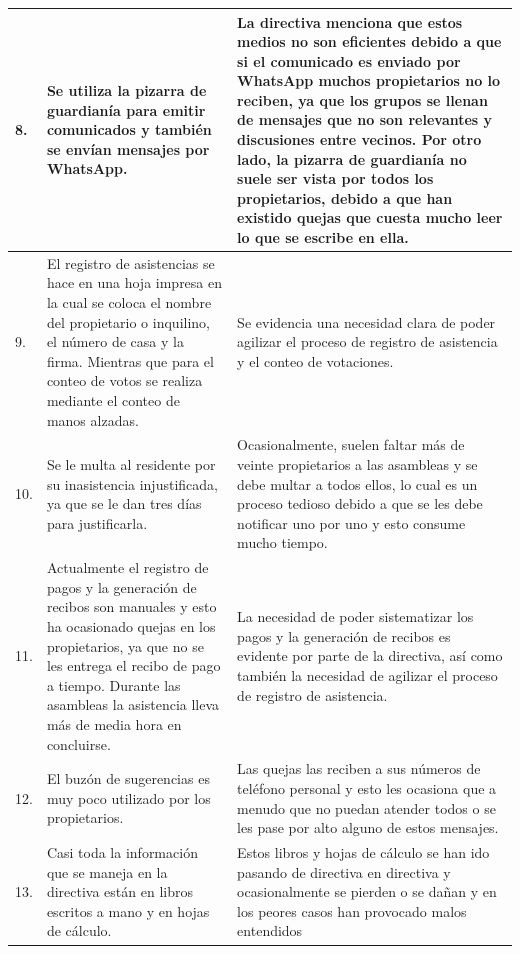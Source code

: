 \begin{footnotesize}
\begin{center}
\begin{longtable}[c]{|p{} |p{} |p{}|}
        \hline
        8. & Se utiliza la pizarra de guardianía para emitir comunicados y también se envían mensajes por WhatsApp.
        & La directiva menciona que estos medios no son eficientes debido a que si el comunicado es enviado por WhatsApp muchos propietarios no lo reciben, ya que los grupos se llenan de mensajes que no son relevantes y discusiones entre vecinos.
        Por otro lado, la pizarra de guardianía no suele ser vista por todos los propietarios, debido a que han existido quejas que cuesta mucho leer lo que se escribe en ella.\\
        \hline
        9. & El registro de asistencias se hace en una hoja impresa en la cual se coloca el nombre del propietario o inquilino, el número de casa y la firma.
        Mientras que para el conteo de votos se realiza mediante el conteo de manos alzadas.
        & Se evidencia una necesidad clara de poder agilizar el proceso de registro de asistencia y el conteo de votaciones.\\
        \hline
        10.
        & Se le multa al residente por su inasistencia injustificada, ya que se le dan tres días para justificarla.
        & Ocasionalmente, suelen faltar más de veinte propietarios a las asambleas y se debe multar a todos ellos, lo cual es un proceso tedioso debido a que se les debe notificar uno por uno y esto consume mucho tiempo.\\
        \hline
        11.
        & Actualmente el registro de pagos y la generación de recibos son manuales y esto ha ocasionado quejas en los propietarios, ya que no se les entrega el recibo de pago a tiempo.
        Durante las asambleas la asistencia lleva más de media hora en concluirse.
        & La necesidad de poder sistematizar los pagos y la generación de recibos es evidente por parte de la directiva, así como también la necesidad de agilizar el proceso de registro de asistencia.\\
        \hline
        12.
        & El buzón de sugerencias es muy poco utilizado por los propietarios.
        & Las quejas las reciben a sus números de teléfono personal y esto les ocasiona que a menudo que no puedan atender todos o se les pase por alto alguno de estos mensajes.\\
        \hline
        13.
        & Casi toda la información que se maneja en la directiva están en libros escritos a mano y en hojas de cálculo.
        & Estos libros y hojas de cálculo se han ido pasando de directiva en directiva y ocasionalmente se pierden o se dañan y en los peores casos han provocado malos entendidos\\
        \hline
    \end{longtable}

\end{center}
\end{footnotesize}

